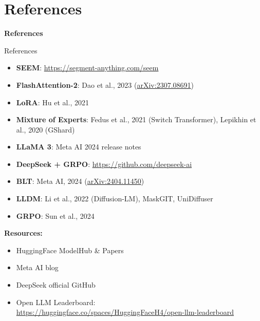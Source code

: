 \section{References}
\begin{frame}{}
    \LARGE \textbf{References}
\end{frame}

\begin{frame}[allowframebreaks]{References}
    \begin{itemize}
        \item \textbf{SEEM}: \url{https://segment-anything.com/seem}
        \item \textbf{FlashAttention-2}: Dao et al., 2023 (\href{https://arxiv.org/abs/2307.08691}{arXiv:2307.08691})
        \item \textbf{LoRA}: Hu et al., 2021
        \item \textbf{Mixture of Experts}: Fedus et al., 2021 (Switch Transformer), Lepikhin et al., 2020 (GShard)
        \item \textbf{LLaMA 3}: Meta AI 2024 release notes
        \item \textbf{DeepSeek + GRPO}: \url{https://github.com/deepseek-ai}
        \item \textbf{BLT}: Meta AI, 2024 (\href{https://arxiv.org/abs/2404.11450}{arXiv:2404.11450})
        \item \textbf{LLDM}: Li et al., 2022 (Diffusion-LM), MaskGIT, UniDiffuser
        \item \textbf{GRPO}: Sun et al., 2024
    \end{itemize}
\framebreak
    \textbf{Resources:}
    \begin{itemize}
        \item HuggingFace ModelHub \& Papers
        \item Meta AI blog
        \item DeepSeek official GitHub
        \item Open LLM Leaderboard: \url{https://huggingface.co/spaces/HuggingFaceH4/open-llm-leaderboard}
    \end{itemize}
\end{frame}